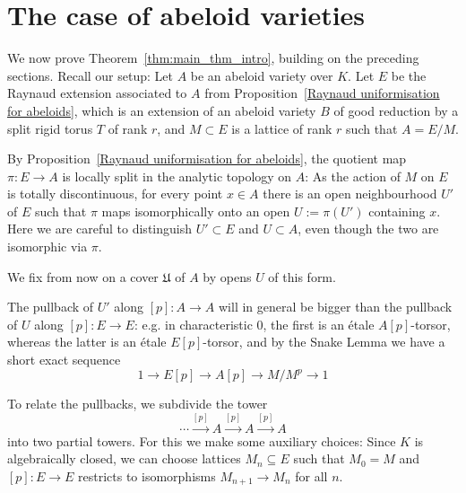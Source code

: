 \documentclass[10pt,oneside]{amsart}
\theoremstyle{definition}
\begin{document}
	
	\section{The case of abeloid varieties}\label{The case of abeloid varieties}
	We now prove Theorem~\ref{thm:main_thm_intro}, building on the preceding sections. Recall our setup: Let $A$ be an abeloid variety over $K$. Let $E$ be the Raynaud extension associated to $A$ from Proposition~\ref{Raynaud uniformisation for abeloids}, which is an extension of an abeloid variety $B$ of good reduction by a split rigid torus $T$ of rank $r$, and $M\subset E$  is a lattice of rank $r$ such that $A=E/M$. 

By Proposition~\ref{Raynaud uniformisation for abeloids}, the quotient map $\pi\colon E\to A$ is locally split in the analytic topology on $A$: As the action of $M$ on $E$ is totally discontinuous, for every point  $x\in A$ there is an open neighbourhood $U'$ of $E$ such that $\pi$ maps isomorphically onto an open $U:=\pi(U')$ containing $x$. Here we are careful to distinguish $U'\subset E$ and $U\subset A$, even though the two are isomorphic via $\pi$.

We fix from now on a cover $\mathfrak U$ of $A$ by opens $U$ of this form.

The pullback of $U'$ along $[p]\colon A\to A$ will in general be bigger than the pullback of $U$ along $[p]:E\to E$: e.g. in characteristic 0, the first is an \'etale $A[p]$-torsor, whereas  the latter is an \'etale $E[p]$-torsor, and by the Snake Lemma we have a short exact sequence
\[1\to E[p]\to A[p]\to M/M^p\to 1\]

To relate the pullbacks, we subdivide the tower 
\[
\cdots\xrightarrow{[p]}A \xrightarrow{[p]}A\xrightarrow{[p]}A
\]
into two partial towers. For this we make some auxiliary choices: Since $K$ is algebraically closed, we can choose lattices $M_n\subseteq E$ such that $M_0=M$ and $[p]\colon E\rightarrow E$ restricts to isomorphisms $M_{n+1}\rightarrow M_n$ for all $n$.
	
\end{document}
